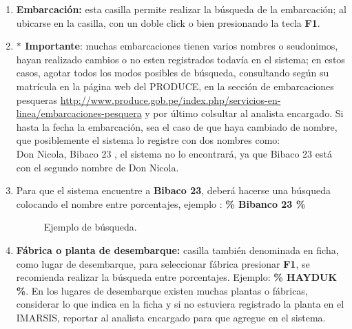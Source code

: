 \documentclass[a4paper,oneside,11pt]{book}
\begin{document}
 
 \begin{enumerate}
 \item\textbf{ Embarcación:} esta casilla permite realizar la búsqueda de la embarcación; al ubicarse en la casilla, con un doble click o bien presionando la tecla \textbf{F1}.
 
 \item [] \textbf{$\ast$ Importante}: muchas embarcaciones tienen varios nombres o seudonimos, hayan realizado cambios o no esten registrados todavía en el sistema; en estos casos, agotar todos los modos posibles de búsqueda, consultando según su matrícula en la página web del PRODUCE, en la sección de embarcaciones pesqueras \url{http://www.produce.gob.pe/index.php/servicios-en-linea/embarcaciones-pesquera} y por último colsultar al analista encargado.
 Si hasta la fecha la embarcación, sea el caso de que haya cambiado de nombre, que posiblemente el sistema lo registre con dos nombres como:   \\ Don Nicola, Bibaco 23 , el sistema no lo encontrará, ya que Bibaco 23 está con el segundo nombre de Don Nicola.\\
\item [] Para que el sistema encuentre a \textbf{Bibaco 23}, deberá hacerse una búsqueda colocando el nombre entre porcentajes, ejemplo :
 \textbf{ \% Bibanco 23 \%}
 
 \begin{figure}[htbp]
 	\centering
  	\caption{Ejemplo de búsqueda.}
 	\vspace{-10pt}
 \end{figure}
 
 \item \textbf{Fábrica o planta de desembarque:} casilla también denominada en ficha, como lugar de desembarque, para seleccionar fábrica presionar \textbf{ F1}, se recomienda realizar la búsqueda entre porcentajes. Ejemplo:  \textbf{\% HAYDUK \%}.
 En los lugares de desembarque existen muchas plantas o fábricas, considerar lo que indica en la ficha y si no estuviera  registrado la planta en el IMARSIS, reportar al analista encargado para que agregue en el sistema.
  

\end{enumerate}
\end{document}
